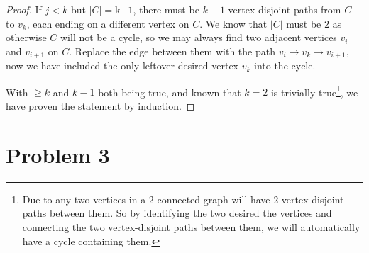 \documentclass[11pt]{article}
\begin{document}
\begin{proof}
If $j < k$ but $|C| = $k$-1$, there must be $k-1$ vertex-disjoint paths from $C$ to $v_k$, each ending on a different vertex on $C$. We know that $|C|$ must be $2$ as otherwise $C$ will not be a cycle, so we may always find two adjacent vertices $v_i$ and $v_{i+1}$ on $C$. Replace the edge between them with the path $v_{i} \to v_k \to v_{i+1}$, now we have included the only leftover desired vertex $v_k$ into the cycle.\newline

With $\geq k$ and $k-1$ both being true, and known that $k=2$ is trivially true\footnote{Due to any two vertices in a 2-connected graph will have 2 vertex-disjoint paths between them. So by identifying the two desired the vertices and connecting the two vertex-disjoint paths between them, we will automatically have a cycle containing them.}, we have proven the statement by induction.





\end{proof}

\section*{Problem 3}





%
%
%





%
% 
% 
\end{document}
